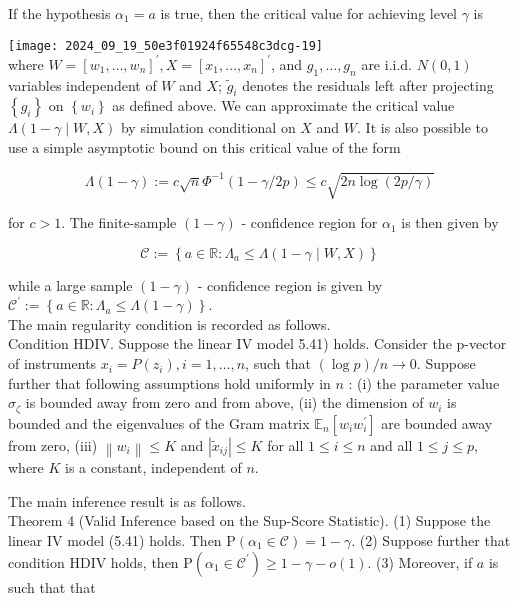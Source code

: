\documentclass[10pt]{article}
\begin{document}
If the hypothesis \(\alpha_{1}=a\) is true, then the critical value for achieving level \(\gamma\) is

\texttt{[image: 2024\_09\_19\_50e3f01924f65548c3dcg-19]}\\
where \(W=\left[w_{1}, \ldots, w_{n}\right]^{\prime}, X=\left[x_{1}, \ldots, x_{n}\right]^{\prime}\), and \(g_{1}, \ldots, g_{n}\) are i.i.d. \(N(0,1)\) variables independent of \(W\) and \(X\); \(\tilde{g}_{i}\) denotes the residuals left after projecting \(\left\{g_{i}\right\}\) on \(\left\{w_{i}\right\}\) as defined above. We can approximate the critical value \(\Lambda(1-\gamma \mid W, X)\) by simulation conditional on \(X\) and \(W\). It is also possible to use a simple asymptotic bound on this critical value of the form

\[
\Lambda(1-\gamma):=c \sqrt{n} \Phi^{-1}(1-\gamma / 2 p) \leq c \sqrt{2 n \log (2 p / \gamma)}
\]

for \(c>1\). The finite-sample \((1-\gamma)\) - confidence region for \(\alpha_{1}\) is then given by

\[
\mathcal{C}:=\left\{a \in \mathbb{R}: \Lambda_{a} \leqslant \Lambda(1-\gamma \mid W, X)\right\}
\]

while a large sample \((1-\gamma)\) - confidence region is given by \(\mathcal{C}^{\prime}:=\left\{a \in \mathbb{R}: \Lambda_{a} \leqslant \Lambda(1-\gamma)\right\}\).\\
The main regularity condition is recorded as follows.\\
Condition HDIV. Suppose the linear IV model 5.41) holds. Consider the p-vector of instruments \(x_{i}=P\left(z_{i}\right), i=1, \ldots, n\), such that \((\log p) / n \rightarrow 0\). Suppose further that following assumptions hold uniformly in \(n\) : (i) the parameter value \(\sigma_{\zeta}\) is bounded away from zero and from above, (ii) the dimension of \(w_{i}\) is bounded and the eigenvalues of the Gram matrix \(\mathbb{E}_{n}\left[w_{i} w_{i}^{\prime}\right]\) are bounded away from zero, (iii) \(\left\|w_{i}\right\| \leqslant K\) and \(\left|\tilde{x}_{i j}\right| \leqslant K\) for all \(1 \leqslant i \leqslant n\) and all \(1 \leqslant j \leqslant p\), where \(K\) is a constant, independent of \(n\).

The main inference result is as follows.\\
Theorem 4 (Valid Inference based on the Sup-Score Statistic). (1) Suppose the linear IV model (5.41) holds. Then \(\mathrm{P}\left(\alpha_{1} \in \mathcal{C}\right)=1-\gamma\). (2) Suppose further that condition HDIV holds, then \(\mathrm{P}\left(\alpha_{1} \in \mathcal{C}^{\prime}\right) \geqslant 1-\gamma-o(1)\). (3) Moreover, if \(a\) is such that that
\end{document}
